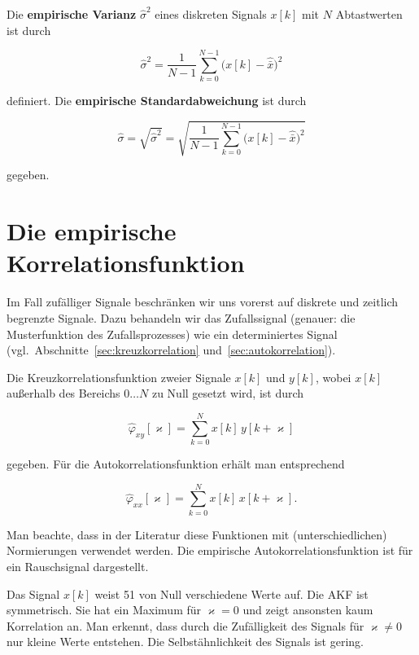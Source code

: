 \begin{definition}
Die \textbf{empirische Varianz} $\hat{\sigma}^2$ eines diskreten Signals $x[k]$ mit $N$ Abtastwerten ist durch

$$
\hat{\sigma}^2 = \frac{1}{N-1} \sum_{k=0}^{N-1} \bigl(x[k] - \hat{\bar{x}}\bigr)^2
$$

definiert. Die \textbf{empirische Standardabweichung} ist durch

$$
\hat{\sigma} = \sqrt{\hat{\sigma}^2} = \sqrt{\frac{1}{N-1} \sum_{k=0}^{N-1} \bigl(x[k] - \hat{\bar{x}}\bigr)^2}
$$

gegeben.
\end{definition}

\section{Die empirische Korrelationsfunktion}
\label{sec:empirische-korrelation}

Im Fall zufälliger Signale beschränken wir uns vorerst auf diskrete und zeitlich begrenzte Signale. Dazu behandeln wir das Zufallssignal (genauer: die Musterfunktion des Zufallsprozesses) wie ein determiniertes Signal (vgl.\ Abschnitte~\ref{sec:kreuzkorrelation} und~\ref{sec:autokorrelation}).

\begin{definition}
Die Kreuzkorrelationsfunktion zweier Signale $x[k]$ und $y[k]$, wobei $x[k]$ außerhalb des Bereichs $0 \ldots N$ zu Null gesetzt wird, ist durch

$$
\hat{\varphi}_{xy}[\varkappa] = \sum_{k=0}^{N} x[k]\, y[k + \varkappa]
$$

gegeben. Für die Autokorrelationsfunktion erhält man entsprechend

$$
\hat{\varphi}_{xx}[\varkappa] = \sum_{k=0}^{N} x[k]\, x[k + \varkappa].
$$
\end{definition}

Man beachte, dass in der Literatur diese Funktionen mit (unterschiedlichen) Normierungen verwendet werden. Die empirische Autokorrelationsfunktion ist für ein Rauschsignal dargestellt.

\begin{beispiel}
Das Signal $x[k]$ weist 51 von Null verschiedene Werte auf. Die AKF ist symmetrisch. Sie hat ein Maximum für $\varkappa = 0$ und zeigt ansonsten kaum Korrelation an. Man erkennt, dass durch die Zufälligkeit des Signals für $\varkappa \neq 0$ nur kleine Werte entstehen. Die Selbstähnlichkeit des Signals ist gering.

\end{beispiel}

